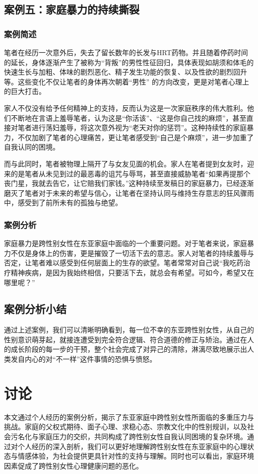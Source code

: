 \documentclass[twocolumn]{ctexart}
\begin{document}
\subsection {案例五：家庭暴力的持续撕裂}
\subsubsection{案例简述}
笔者在经历一次意外后，失去了留长数年的长发与HRT药物。并且随着停药时间的延长，身体逐渐产生了被称为“背叛”的男性性征回归，具体表现如胡须和体毛的快速生长与加粗、体味的剧烈恶化、精子发生功能的恢复、以及性欲的剧烈回升等。这些变化不仅让笔者的身体再次朝着“男性” 的方向改变，更是对笔者心理上的巨大打击。

家人不仅没有给予任何精神上的支持，反而认为这是一次家庭秩序的伟大胜利。他们不断地在言语上羞辱笔者，认为这是“你活该”、“这是你自己找的麻烦”，甚至直接对笔者进行荡妇羞辱，将这次意外视为“老天对你的惩罚”。这种持续性的家庭暴力，不仅加剧了笔者的心理痛苦，更让笔者感受到“自己是个麻烦”，进一步加重了自我认同的困境。

而与此同时，笔者被物理上隔开了与女友见面的机会。家人在笔者提到女友时，迎来的是笔者从未见到过的最恶毒的诅咒与辱骂，甚至直接威胁笔者“如果再提那个丧门星，我就去告它，让它赔我们家钱。”这种持续至发稿日的家庭暴力，已经逐渐磨灭了笔者对于未来的希望与信心，让笔者在坚持认同与维持生存意志的狂风骤雨中，感受到了前所未有的孤独与绝望。

\subsubsection{案例分析}
家庭暴力是跨性别女性在东亚家庭中面临的一个重要问题。对于笔者来说，家庭暴力不仅是身体上的伤害，更是摧毁了一切活下去的意志。家人对笔者的持续羞辱与否定，让笔者难以感受到任何层面上的生存的欲望。笔者常常对自己说“我吃药治疗精神疾病，是因为我始终相信，只要活下去，就总会有希望。可如今，希望又在哪里呢？”

\subsection{案例分析小结}
通过上述案例，我们可以清晰明确看到，每一位不幸的东亚跨性别女性，从自己的性别意识萌芽起，就接连遭受到完全符合逻辑、符合道德的修正与矫治。通过在人的成长阶段的每一步的干预，整个社会完成了对异己的清除，淋漓尽致地展示出人类发自内心的对“不一样”这件事情的恐惧与愤怒\cite{amnesty2019transmedical}。

\section{讨论}
本文通过个人经历的案例分析，揭示了东亚家庭中跨性别女性所面临的多重压力与挑战。家庭的父权式期待、面子心理、求稳心态、宗教文化中的性别规训，以及社会污名化与家庭压力的交织，共同构成了跨性别女性自我认同困境的复杂环境。通过对个人经历的深入剖析，我们可以更好地理解跨性别女性在东亚家庭中的心理状态与情感体验，为社会提供更具针对性的支持与理解。同时也可以看出，家庭环境因素促成了跨性别女性心理健康问题的恶化\cite{lgbtmental2021health}。
\end{document}
